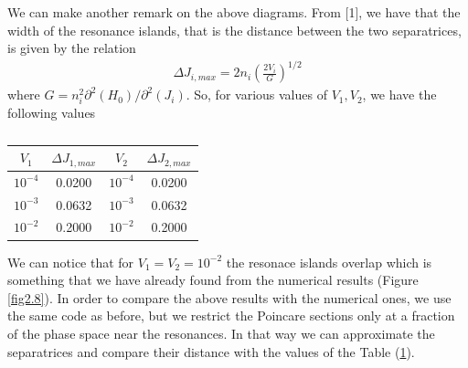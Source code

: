 We can make another remark on the above diagrams. From [1], we have that the width of the resonance islands, that is the distance between the two separatrices, is given by the relation 
	\begin{align*}\label{eq2.22}
		\Delta J_{i,max}= 2n_i \left( \frac{2V_i}{G}\right)^{1/2}
	\end{align*}
	where $G=n_i^2\partial^2(H_0)/\partial^2(J_i)$.
So, for various values of $V_1,V_2$, we have the following values 
\newpage
	\begin{table}[th]
		\centering 
		\begin{tabular}{c|c||c|c}
			$V_1$ & $\Delta J_{1,max}$ & $V_2$ & $\Delta J_{2,max}$ \\ 
			\hline\hline
			$10^{-4}$ & 0.0200& $10^{-4}$ & 0.0200 \\ 
			$10^{-3}$ & 0.0632& $10^{-3}$ & 0.0632 \\
			$10^{-2}$ & 0.2000& $10^{-2}$ & 0.2000 
		\end{tabular}
		\caption{}
		\label{tab2.1}
	\end{table}
	We can notice that for $V_1=V_2=10^{-2}$ the resonace islands overlap which is something that we have already found from the numerical results (Figure \ref{fig2.8}).
	In order to compare the above results with the numerical ones, we use the same code as before, but we restrict the Poincare sections only at a fraction of the phase space near the resonances. In that way we can approximate the separatrices and compare their distance with the values of the Table (\ref{tab2.1}).
